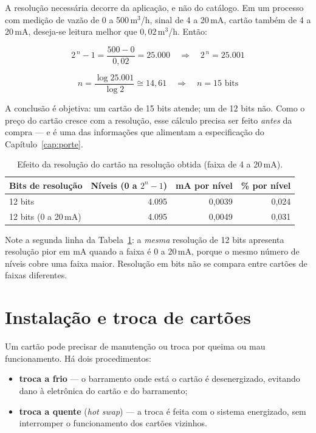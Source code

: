 A resolução necessária decorre da aplicação, e não do catálogo. Em um processo com medição de vazão
de 0 a 500\,m$^3$/h, sinal de 4 a 20\,mA, cartão também de 4 a 20\,mA, deseja-se leitura melhor que
$0{,}02$\,m$^3$/h. Então:

$$
2^{\,n} - 1 = \frac{500 - 0}{0{,}02} = 25.000
\quad\Longrightarrow\quad 2^{\,n} = 25.001
$$

$$
n = \frac{\log 25.001}{\log 2} \cong 14{,}61 \quad\Longrightarrow\quad n = 15 \text{ bits}
$$

A conclusão é objetiva: um cartão de 15 bits atende; um de 12 bits não. Como o preço do cartão cresce
com a resolução, esse cálculo precisa ser feito \emph{antes} da compra --- e é uma das informações que
alimentam a especificação do Capítulo~\ref{cap:porte}.

\begin{table}[H]
  \centering
  \caption{Efeito da resolução do cartão na resolução obtida (faixa de 4 a 20\,mA).}
  \label{tab:resolucao}
  \begin{tabular}{l r r r}
    \toprule
    Bits de resolução & Níveis (0 a $2^n-1$) & mA por nível & \% por nível \\
    \midrule
    12 bits & 4.095 & 0,0039 & 0,024 \\
    12 bits (0 a 20\,mA) & 4.095 & 0,0049 & 0,031 \\
    \bottomrule
  \end{tabular}
\end{table}

\begin{atencao}
Note a segunda linha da Tabela~\ref{tab:resolucao}: a \emph{mesma} resolução de 12 bits apresenta
resolução pior em mA quando a faixa é 0 a 20\,mA, porque o mesmo número de níveis cobre uma faixa
maior. Resolução em bits não se compara entre cartões de faixas diferentes.
\end{atencao}

\section{Instalação e troca de cartões}

Um cartão pode precisar de manutenção ou troca por queima ou mau funcionamento. Há dois
procedimentos:

\begin{itemize}
  \item \textbf{troca a frio} --- o barramento onde está o cartão é desenergizado, evitando dano à
        eletrônica do cartão e do barramento;
  \item \textbf{troca a quente} (\emph{hot swap}) --- a troca é feita com o sistema energizado, sem
        interromper o funcionamento dos cartões vizinhos.
\end{itemize}

